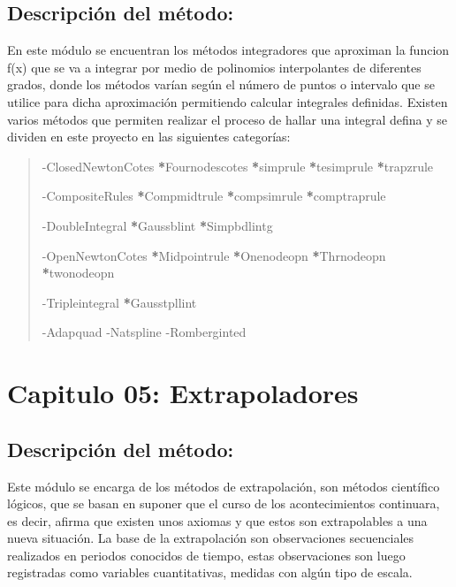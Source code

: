\documentclass[letterpaper,10pt,oneside]{sphinxmanual}
\theoremstyle{plain}%
\theoremstyle{definition}%
\theoremstyle{remark}%
\begin{document}
\section{Descripción del método:}
\label{chapter04:descripcion-del-metodo}
En este módulo se encuentran los métodos integradores que aproximan la funcion f(x) que se va a integrar por medio de polinomios interpolantes de diferentes grados, donde los métodos varían según el número de puntos o intervalo que se utilice para dicha aproximación permitiendo calcular integrales definidas.
Existen varios métodos que permiten realizar el proceso de hallar una integral defina y se dividen en este proyecto en las siguientes categorías:
\begin{quote}

\begin{optionlist}{3cm}
\item [-ClosedNewtonCotes]  
{\color{red}\bfseries{}*}Fournodescotes
{\color{red}\bfseries{}*}simprule
{\color{red}\bfseries{}*}tesimprule
{\color{red}\bfseries{}*}trapzrule
\item [-CompositeRules]  
{\color{red}\bfseries{}*}Compmidtrule
{\color{red}\bfseries{}*}compsimrule
{\color{red}\bfseries{}*}comptraprule
\item [-DoubleIntegral]  
{\color{red}\bfseries{}*}Gaussblint
{\color{red}\bfseries{}*}Simpbdlintg
\item [-OpenNewtonCotes]  
{\color{red}\bfseries{}*}Midpointrule
{\color{red}\bfseries{}*}Onenodeopn
{\color{red}\bfseries{}*}Thrnodeopn
{\color{red}\bfseries{}*}twonodeopn
\item [-Tripleintegral]  
{\color{red}\bfseries{}*}Gausstpllint
\end{optionlist}

-Adapquad
-Natspline
-Romberginted
\end{quote}


\chapter{Capitulo 05: Extrapoladores}
\label{chapter05:capitulo-05-extrapoladores}\label{chapter05::doc}

\section{Descripción del método:}
\label{chapter05:descripcion-del-metodo}
Este módulo se encarga de los métodos de extrapolación, son métodos científico lógicos, que se basan en suponer que el curso de los acontecimientos continuara, es decir, afirma que existen unos axiomas y que estos son extrapolables a una nueva situación. La base de la extrapolación son observaciones secuenciales realizados en periodos conocidos de tiempo, estas observaciones son luego registradas como variables cuantitativas, medidas con algún tipo de escala.\medskip
\end{document}
